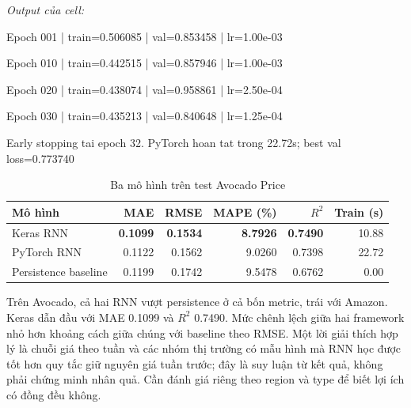 \documentclass[12pt,a4paper]{report}
\begin{document}
\noindent\textit{Output của cell:}
\begin{NotebookOutput}
Epoch 001 | train=0.506085 | val=0.853458 | lr=1.00e-03

Epoch 010 | train=0.442515 | val=0.857946 | lr=1.00e-03

Epoch 020 | train=0.438074 | val=0.958861 | lr=2.50e-04

Epoch 030 | train=0.435213 | val=0.840648 | lr=1.25e-04

Early stopping tai epoch 32.
PyTorch hoan tat trong 22.72s; best val loss=0.773740
\end{NotebookOutput}

\begin{table}[htbp]\centering\caption{Ba mô hình trên test Avocado Price}\label{tab:avocado-results}
\begin{tabular}{lrrrrr}\toprule
\textbf{Mô hình} & \textbf{MAE} & \textbf{RMSE} & \textbf{MAPE (\%)} & \textbf{$R^2$} & \textbf{Train (s)}\\\midrule
Keras RNN & \textbf{0.1099} & \textbf{0.1534} & \textbf{8.7926} & \textbf{0.7490} & 10.88\\
PyTorch RNN & 0.1122 & 0.1562 & 9.0260 & 0.7398 & 22.72\\
Persistence baseline & 0.1199 & 0.1742 & 9.5478 & 0.6762 & 0.00\\\bottomrule\end{tabular}
\end{table}

Trên Avocado, cả hai RNN vượt persistence ở cả bốn metric, trái với Amazon. Keras dẫn đầu với MAE 0.1099 và $R^2$ 0.7490. Mức chênh lệch giữa hai framework nhỏ hơn khoảng cách giữa chúng với baseline theo RMSE. Một lời giải thích hợp lý là chuỗi giá theo tuần và các nhóm thị trường có mẫu hình mà RNN học được tốt hơn quy tắc giữ nguyên giá tuần trước; đây là suy luận từ kết quả, không phải chứng minh nhân quả. Cần đánh giá riêng theo region và type để biết lợi ích có đồng đều không.
\end{document}
